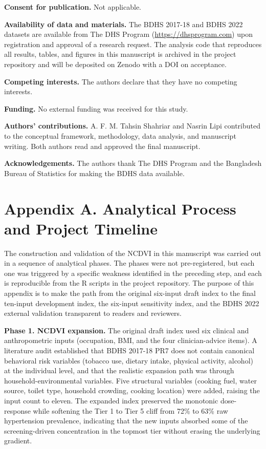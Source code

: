 \documentclass[
  12pt,
  a4paper]{article}
\begin{document}
\textbf{Consent for publication.} Not applicable.

\textbf{Availability of data and materials.} The BDHS 2017-18 and BDHS 2022 datasets are available from The DHS Program (\url{https://dhsprogram.com}) upon registration and approval of a research request. The analysis code that reproduces all results, tables, and figures in this manuscript is archived in the project repository and will be deposited on Zenodo with a DOI on acceptance.

\textbf{Competing interests.} The authors declare that they have no competing interests.

\textbf{Funding.} No external funding was received for this study.

\textbf{Authors' contributions.} A. F. M. Tahsin Shahriar and Nasrin Lipi contributed to the conceptual framework, methodology, data analysis, and manuscript writing. Both authors read and approved the final manuscript.

\textbf{Acknowledgements.} The authors thank The DHS Program and the Bangladesh Bureau of Statistics for making the BDHS data available.



\newpage
\appendix

\section*{Appendix A. Analytical Process and Project Timeline}\label{appendix-a.-analytical-process-and-project-timeline}

The construction and validation of the NCDVI in this manuscript was carried out in a sequence of analytical phases. The phases were not pre-registered, but each one was triggered by a specific weakness identified in the preceding step, and each is reproducible from the R scripts in the project repository. The purpose of this appendix is to make the path from the original six-input draft index to the final ten-input development index, the six-input sensitivity index, and the BDHS 2022 external validation transparent to readers and reviewers.

\textbf{Phase 1. NCDVI expansion.} The original draft index used six clinical and anthropometric inputs (occupation, BMI, and the four clinician-advice items). A literature audit established that BDHS 2017-18 PR7 does not contain canonical behavioral risk variables (tobacco use, dietary intake, physical activity, alcohol) at the individual level, and that the realistic expansion path was through household-environmental variables. Five structural variables (cooking fuel, water source, toilet type, household crowding, cooking location) were added, raising the input count to eleven. The expanded index preserved the monotonic dose-response while softening the Tier 1 to Tier 5 cliff from 72\% to 63\% raw hypertension prevalence, indicating that the new inputs absorbed some of the screening-driven concentration in the topmost tier without erasing the underlying gradient.
\end{document}
